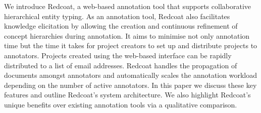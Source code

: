 We introduce Redcoat, a web-based annotation tool that supports collaborative hierarchical entity typing. As an annotation tool, Redcoat also facilitates knowledge elicitation by allowing the creation and continuous refinement of concept hierarchies during annotation. It aims to minimise not only annotation time but the time it takes for project creators to set up and distribute projects to annotators. Projects created using the web-based interface can be rapidly distributed to a list of email addresses. Redcoat handles the propagation of documents amongst annotators and automatically scales the annotation workload depending on the number of active annotators. In this paper we discuss these key features and outline Redcoat's system architecture. We also highlight Redcoat's unique benefits over existing annotation tools via a qualitative comparison.